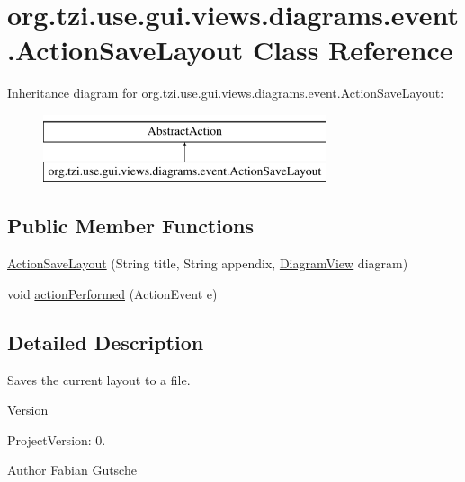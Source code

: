 \hypertarget{classorg_1_1tzi_1_1use_1_1gui_1_1views_1_1diagrams_1_1event_1_1_action_save_layout}{\section{org.\-tzi.\-use.\-gui.\-views.\-diagrams.\-event.\-Action\-Save\-Layout Class Reference}
\label{classorg_1_1tzi_1_1use_1_1gui_1_1views_1_1diagrams_1_1event_1_1_action_save_layout}
}
Inheritance diagram for org.\-tzi.\-use.\-gui.\-views.\-diagrams.\-event.\-Action\-Save\-Layout\-:\begin{figure}[H]
\begin{center}
\leavevmode
\includegraphics[height=2.000000cm]{classorg_1_1tzi_1_1use_1_1gui_1_1views_1_1diagrams_1_1event_1_1_action_save_layout}
\end{center}
\end{figure}
\subsection*{Public Member Functions}
\begin{DoxyCompactItemize}
\item 
\hyperlink{classorg_1_1tzi_1_1use_1_1gui_1_1views_1_1diagrams_1_1event_1_1_action_save_layout_a9364bd064a145751a8f5f7acdfd57c10}{Action\-Save\-Layout} (String title, String appendix, \hyperlink{classorg_1_1tzi_1_1use_1_1gui_1_1views_1_1diagrams_1_1_diagram_view}{Diagram\-View} diagram)
\item 
void \hyperlink{classorg_1_1tzi_1_1use_1_1gui_1_1views_1_1diagrams_1_1event_1_1_action_save_layout_a5410e28e85c6e8a290f8e4f7b95da652}{action\-Performed} (Action\-Event e)
\end{DoxyCompactItemize}


\subsection{Detailed Description}
Saves the current layout to a file.

\begin{DoxyVersion}{Version}

\end{DoxyVersion}
\begin{DoxyParagraph}{Project\-Version\-:}
0. 
\end{DoxyParagraph}
\begin{DoxyAuthor}{Author}
Fabian Gutsche 
\end{DoxyAuthor}


